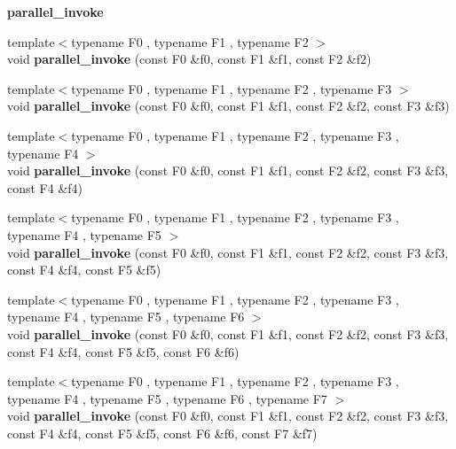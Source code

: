 \begin{Indent}{\bf parallel\+\_\+invoke}
\begin{DoxyCompactItemize}
\item 
\hypertarget{group__algorithms_gaa979656a4c207782b74800c6c42982f5}{}{\footnotesize template$<$typename F0 , typename F1 , typename F2 $>$ }\\void {\bfseries parallel\+\_\+invoke} (const F0 \&f0, const F1 \&f1, const F2 \&f2)\label{group__algorithms_gaa979656a4c207782b74800c6c42982f5}

\item 
\hypertarget{group__algorithms_ga219cb8061b7cf5454c0bc4d67cff1e34}{}{\footnotesize template$<$typename F0 , typename F1 , typename F2 , typename F3 $>$ }\\void {\bfseries parallel\+\_\+invoke} (const F0 \&f0, const F1 \&f1, const F2 \&f2, const F3 \&f3)\label{group__algorithms_ga219cb8061b7cf5454c0bc4d67cff1e34}

\item 
\hypertarget{group__algorithms_ga8319ee980cd7cfb03f12ffc2a5ea4895}{}{\footnotesize template$<$typename F0 , typename F1 , typename F2 , typename F3 , typename F4 $>$ }\\void {\bfseries parallel\+\_\+invoke} (const F0 \&f0, const F1 \&f1, const F2 \&f2, const F3 \&f3, const F4 \&f4)\label{group__algorithms_ga8319ee980cd7cfb03f12ffc2a5ea4895}

\item 
\hypertarget{group__algorithms_ga295daf6f7394fba29a979b914be09fc6}{}{\footnotesize template$<$typename F0 , typename F1 , typename F2 , typename F3 , typename F4 , typename F5 $>$ }\\void {\bfseries parallel\+\_\+invoke} (const F0 \&f0, const F1 \&f1, const F2 \&f2, const F3 \&f3, const F4 \&f4, const F5 \&f5)\label{group__algorithms_ga295daf6f7394fba29a979b914be09fc6}

\item 
\hypertarget{group__algorithms_ga7652a01622a2f28df1e0edf40b691190}{}{\footnotesize template$<$typename F0 , typename F1 , typename F2 , typename F3 , typename F4 , typename F5 , typename F6 $>$ }\\void {\bfseries parallel\+\_\+invoke} (const F0 \&f0, const F1 \&f1, const F2 \&f2, const F3 \&f3, const F4 \&f4, const F5 \&f5, const F6 \&f6)\label{group__algorithms_ga7652a01622a2f28df1e0edf40b691190}

\item 
\hypertarget{group__algorithms_gadd8826371866c58e41dee3546c35d2c8}{}{\footnotesize template$<$typename F0 , typename F1 , typename F2 , typename F3 , typename F4 , typename F5 , typename F6 , typename F7 $>$ }\\void {\bfseries parallel\+\_\+invoke} (const F0 \&f0, const F1 \&f1, const F2 \&f2, const F3 \&f3, const F4 \&f4, const F5 \&f5, const F6 \&f6, const F7 \&f7)\label{group__algorithms_gadd8826371866c58e41dee3546c35d2c8}


\end{DoxyCompactItemize}
\end{Indent}
